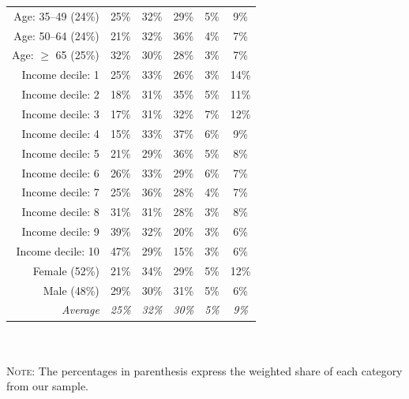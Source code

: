 \documentclass[english,5p,authoryear]{elsarticle}
\begin{document}
\begin{appendices}
\begin{spacing}{1.8}
\begin{table}[ht]
{\begin{tabular}{rccccc}
  Age: 35--49 (24\%) & 25\% & 32\% & 29\% & 5\% & 9\% \\ 
  Age: 50--64 (24\%) & 21\% & 32\% & 36\% & 4\% & 7\% \\ 
  Age: $\geq$ 65 (25\%) & 32\% & 30\% & 28\% & 3\% & 7\% \\
  \hline
  Income decile: 1 & 25\% & 33\% & 26\% & 3\% & 14\% \\ 
  Income decile: 2 & 18\% & 31\% & 35\% & 5\% & 11\% \\
  Income decile: 3 & 17\% & 31\% & 32\% & 7\% & 12\% \\
  Income decile: 4 & 15\% & 33\% & 37\% & 6\% & 9\% \\
  Income decile: 5 & 21\% & 29\% & 36\% & 5\% & 8\% \\
  Income decile: 6 & 26\% & 33\% & 29\% & 6\% & 7\% \\
  Income decile: 7 & 25\% & 36\% & 28\% & 4\% & 7\% \\
  Income decile: 8 & 31\% & 31\% & 28\% & 3\% & 8\% \\
  Income decile: 9 & 39\% & 32\% & 20\% & 3\% & 6\% \\
  Income decile: 10 & 47\% & 29\% & 15\% & 3\% & 6\% \\
  \hline
  Female (52\%) & 21\% & 34\% & 29\% & 5\% & 12\% \\
  Male (48\%) & 29\% & 30\% & 31\% & 5\% & 6\% \\
  \hline
  \textit{Average} & \textit{25\%} & \textit{32\%} & \textit{30\%} & \textit{5\%} & \textit{9\%} \\ 
   \hline \hline
\end{tabular}
}
\\ $\quad$ \\
{\footnotesize \textsc{Note:} The percentages in parenthesis express the weighted share of each category from our sample.}
\label{tab:gilets_jaunes_agglo}
\end{table}
\end{spacing}




\end{appendices}
\end{document}
